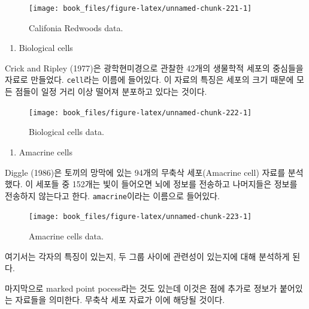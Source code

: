 \documentclass[b5paper,]{scrbook}
\providecommand{\tightlist}{%
  \setlength{\itemsep}{0pt}\setlength{\parskip}{0pt}}
\theoremstyle{plain}
\theoremstyle{definition}
\numberwithin{equation}{section}
\begin{document}
\begin{figure}

{\centering \texttt{[image: book\_files/figure-latex/unnamed-chunk-221-1]} 

}

\caption{Califonia Redwoods data.}\label{fig:unnamed-chunk-221}
\end{figure}

\begin{enumerate}
\def\labelenumi{\arabic{enumi}.}
\setcounter{enumi}{2}
\tightlist
\item
  Biological cells
\end{enumerate}

Crick and Ripley (1977)은 광학현미경으로 관찰한 42개의 생물학적 세포의
중심들을 자료로 만들었다. \texttt{cell}라는 이름에 들어있다. 이 자료의
특징은 세포의 크기 때문에 모든 점들이 일정 거리 이상 떨어져 분포하고
있다는 것이다.

\begin{figure}

{\centering \texttt{[image: book\_files/figure-latex/unnamed-chunk-222-1]} 

}

\caption{Biological cells data.}\label{fig:unnamed-chunk-222}
\end{figure}

\begin{enumerate}
\def\labelenumi{\arabic{enumi}.}
\setcounter{enumi}{3}
\tightlist
\item
  Amacrine cells
\end{enumerate}

Diggle (1986)은 토끼의 망막에 있는 94개의 무축삭 세포(Amacrine cell)
자료를 분석했다. 이 세포들 중 152개는 빛이 들어오면 뇌에 정보를 전송하고
나머지들은 정보를 전송하지 않는다고 한다. \texttt{amacrine}이라는
이름으로 들어있다.

\begin{figure}

{\centering \texttt{[image: book\_files/figure-latex/unnamed-chunk-223-1]} 

}

\caption{Amacrine cells data.}\label{fig:unnamed-chunk-223}
\end{figure}

여기서는 각자의 특징이 있는지, 두 그룹 사이에 관련성이 있는지에 대해
분석하게 된다.

마지막으로 marked point pocess라는 것도 있는데 이것은 점에 추가로 정보가
붙어있는 자료들을 의미한다. 무축삭 세포 자료가 이에 해당될 것이다.
\end{document}

